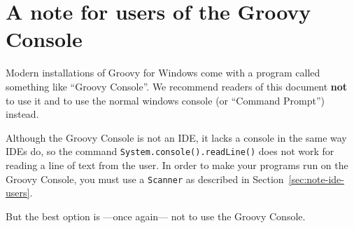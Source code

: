 \section{A note for users of the Groovy Console}
\label{sec:note-ide-console-groovy-users}

Modern installations of Groovy for Windows come with a program called
something like ``Groovy Console''. We recommend readers of this
document \textbf{not} to use it and to use the normal windows console (or
``Command Prompt'') instead. 

Although the Groovy Console is not an IDE, it lacks a console in
the same way IDEs do, so the command
\verb+System.console().readLine()+ does not work for reading a line of
text from the user. In order to make your programs run on the Groovy
Console, you must use a \verb+Scanner+ as described in
Section~\ref{sec:note-ide-users}. 

But the best option is ---once again--- not to use the Groovy Console. 


